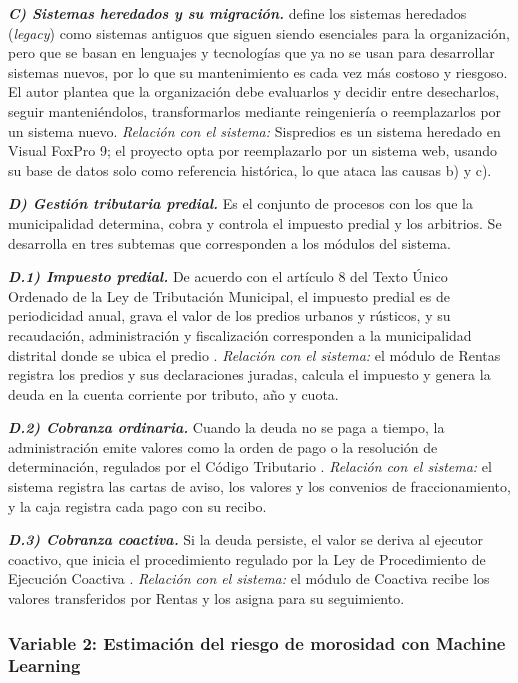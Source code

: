 \documentclass[12pt,a4paper]{report}
\begin{document}
\noindent\textbf{\textit{C) Sistemas heredados y su migración.}} \textcite{sommerville2011} define los sistemas heredados (\textit{legacy}) como sistemas antiguos que siguen siendo esenciales para la organización, pero que se basan en lenguajes y tecnologías que ya no se usan para desarrollar sistemas nuevos, por lo que su mantenimiento es cada vez más costoso y riesgoso. El autor plantea que la organización debe evaluarlos y decidir entre desecharlos, seguir manteniéndolos, transformarlos mediante reingeniería o reemplazarlos por un sistema nuevo. \textit{Relación con el sistema:} Sispredios es un sistema heredado en Visual FoxPro 9; el proyecto opta por reemplazarlo por un sistema web, usando su base de datos solo como referencia histórica, lo que ataca las causas b) y c).

\noindent\textbf{\textit{D) Gestión tributaria predial.}} Es el conjunto de procesos con los que la municipalidad determina, cobra y controla el impuesto predial y los arbitrios. Se desarrolla en tres subtemas que corresponden a los módulos del sistema.

\noindent\textbf{\textit{D.1) Impuesto predial.}} De acuerdo con el artículo 8 del Texto Único Ordenado de la Ley de Tributación Municipal, el impuesto predial es de periodicidad anual, grava el valor de los predios urbanos y rústicos, y su recaudación, administración y fiscalización corresponden a la municipalidad distrital donde se ubica el predio \parencite{tuoltm}. \textit{Relación con el sistema:} el módulo de Rentas registra los predios y sus declaraciones juradas, calcula el impuesto y genera la deuda en la cuenta corriente por tributo, año y cuota.

\noindent\textbf{\textit{D.2) Cobranza ordinaria.}} Cuando la deuda no se paga a tiempo, la administración emite valores como la orden de pago o la resolución de determinación, regulados por el Código Tributario \parencite{codigotributario}. \textit{Relación con el sistema:} el sistema registra las cartas de aviso, los valores y los convenios de fraccionamiento, y la caja registra cada pago con su recibo.

\noindent\textbf{\textit{D.3) Cobranza coactiva.}} Si la deuda persiste, el valor se deriva al ejecutor coactivo, que inicia el procedimiento regulado por la Ley de Procedimiento de Ejecución Coactiva \parencite{ley26979}. \textit{Relación con el sistema:} el módulo de Coactiva recibe los valores transferidos por Rentas y los asigna para su seguimiento.

\subsubsection{Variable 2: Estimación del riesgo de morosidad con Machine Learning}
\end{document}
